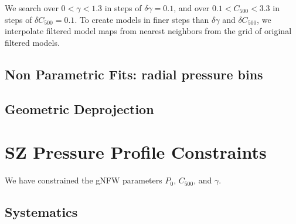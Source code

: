 \documentclass[iop,numberedappendix,apj]{emulateapj}
\begin{document}
{We search over $0 < \gamma < 1.3$ in steps of $\delta \gamma = 0.1$, and over
$0.1 < C_{500} < 3.3$ in steps of $\delta C_{500} = 0.1$. To create models in finer steps than $\delta \gamma$ 
and $\delta C_{500}$, we interpolate filtered model maps from nearest neighbors from the grid of original 
filtered models. 

\subsection{Non Parametric Fits: radial pressure bins}

\subsection{Geometric Deprojection}

\section{SZ Pressure Profile Constraints}
\label{sec:pp_constraints}

We have constrained the gNFW parameters $P_0$, $C_{500}$, and $\gamma$.


\subsection{Systematics}
\label{sec:systematics}



}
\end{document}
